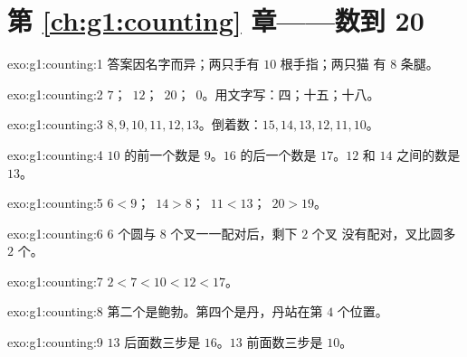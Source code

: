 \section*{第 \ref{ch:g1:counting} 章——数到 20}

\begin{solution}{exo:g1:counting:1}
答案因名字而异；两只手有 $10$ 根手指；两只猫
有 $8$ 条腿。
\end{solution}

\begin{solution}{exo:g1:counting:2}
$7$；\ $12$；\ $20$；\ $0$。用文字写：四；十五；十八。
\end{solution}

\begin{solution}{exo:g1:counting:3}
$8, 9, 10, 11, 12, 13$。倒着数：$15, 14, 13, 12, 11, 10$。
\end{solution}

\begin{solution}{exo:g1:counting:4}
$10$ 的前一个数是 $9$。$16$ 的后一个数是 $17$。$12$ 和
$14$ 之间的数是 $13$。
\end{solution}

\begin{solution}{exo:g1:counting:5}
$6 < 9$；\ $14 > 8$；\ $11 < 13$；\ $20 > 19$。
\end{solution}

\begin{solution}{exo:g1:counting:6}
$6$ 个圆与 $8$ 个叉一一配对后，剩下 $2$ 个叉
没有配对，叉比圆多 $2$ 个。
\end{solution}

\begin{solution}{exo:g1:counting:7}
$2 < 7 < 10 < 12 < 17$。
\end{solution}

\begin{solution}{exo:g1:counting:8}
第二个是鲍勃。第四个是丹，丹站在第 $4$ 个位置。
\end{solution}

\begin{solution}{exo:g1:counting:9}
$13$ 后面数三步是 $16$。$13$ 前面数三步是 $10$。
\end{solution}
